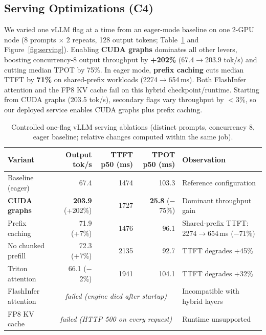 \documentclass[10pt,letterpaper,twocolumn]{article}
\begin{document}
\subsection{Serving Optimizations (C4)}\label{sec:serving}

We varied one vLLM flag at a time from an eager-mode baseline on one 2-GPU node (8 prompts $\times$ 2 repeats, 128
output tokens; Table~\ref{tab:serving} and Figure~\ref{fig:serving}). Enabling \textbf{CUDA graphs} dominates all other
levers, boosting concurrency-8 output throughput by \textbf{+202\%} (67.4$\rightarrow$203.9 tok/s) and cutting median
TPOT by 75\%. In eager mode, \textbf{prefix caching} cuts median TTFT by \textbf{71\%} on shared-prefix workloads
(2274$\rightarrow$654\,ms). Both FlashInfer attention and the FP8 KV cache fail on this hybrid checkpoint/runtime.
Starting from CUDA graphs (203.5 tok/s), secondary flags vary throughput by $<$3\%, so our deployed service enables
CUDA graphs plus prefix caching.

\begin{table}[t]
\centering\small
\caption{Controlled one-flag vLLM serving ablations (distinct prompts, concurrency 8, eager baseline; relative changes computed within the same job).}\label{tab:serving}
\renewcommand{\arraystretch}{1.10}
\setlength{\tabcolsep}{8pt}
\begin{tabular}{@{}l r r r l@{}}
\toprule
\textbf{Variant} & \textbf{Output tok/s} & \textbf{TTFT p50 (ms)} & \textbf{TPOT p50 (ms)} & \textbf{Observation} \\
\midrule
Baseline (eager) & 67.4 & 1474 & 103.3 & Reference configuration \\
\rowcolor{RowTint}\textbf{CUDA graphs} & \textbf{203.9} (+202\%) & 1727 & \textbf{25.8} ($-$75\%) & Dominant throughput gain \\
Prefix caching & 71.9 (+7\%) & 1476 & 96.1 & Shared-prefix TTFT: 2274$\rightarrow$654\,ms ($-$71\%) \\
No chunked prefill & 72.3 (+7\%) & 2135 & 92.7 & TTFT degrades +45\% \\
Triton attention & 66.1 ($-$2\%) & 1941 & 104.1 & TTFT degrades +32\% \\
FlashInfer attention & \multicolumn{3}{c}{\textit{failed (engine died after startup)}} & Incompatible with hybrid layers \\
FP8 KV cache & \multicolumn{3}{c}{\textit{failed (HTTP 500 on every request)}} & Runtime unsupported \\
\bottomrule
\end{tabular}
\end{table}
\end{document}
